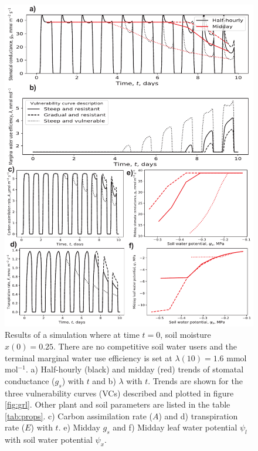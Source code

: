 \documentclass[utf8]{frontiersSCNS} %
\begin{document}
\begin{figure}[h]
    \begin{center}
         \includegraphics[scale=0.65]{WUS_no_comp.pdf} 
    \end{center}
    \caption{Results of a simulation where at time $t=0$, soil moisture $x(0) =0.25$. There are no competitive soil water users and the terminal marginal water use efficiency is set at $\lambda(10) = 1.6$ mmol mol$^{-1}$. a) Half-hourly (black) and midday (red) trends of stomatal conductance ($g_s$) with $t$ and b) $\lambda$ with $t$. Trends are shown for the three vulnerability curves (VCs) described and plotted in figure \ref{fig:grl}. Other plant and soil parameters are listed in the table \ref{tab:props}. c) Carbon assimilation rate ($A$) and d) transpiration rate ($E$) with $t$. e) Midday $g_s$ and f) Midday leaf water potential $\psi_l$ with soil water potential $\psi_x$.}
    \label{fig:WUS_no_comp}
\end{figure}
\end{document}
